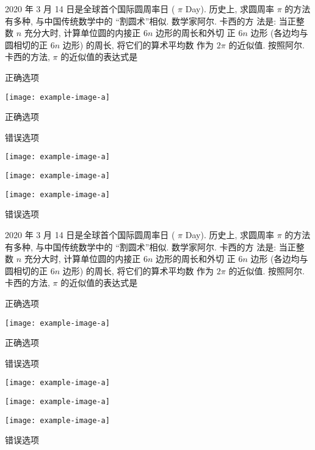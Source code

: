 \documentclass{ctexart}
\begin{document}
    2020 年 3 月 14 日是全球首个国际圆周率日 ( $\pi$ Day). 历史上, 求圆周率 $\pi$ 的方法有多种, 与中国传统数学中的 “割圆术”相似. 数学家阿尔. 卡西的方 法是: 当正整数 $n$ 充分大时, 计算单位圆的内接正 $6 n$ 边形的周长和外切 正 $6 n$ 边形 (各边均与圆相切的正 $6 n$ 边形) 的周长, 将它们的算术平均数 作为 $2 \pi$ 的近似值. 按照阿尔. 卡西的方法, $\pi$ 的近似值的表达式是 \paren

    \begin{xchoices}[mode = figure, items = 4]
      \item* 正确选项
      \item  \texttt{[image: example-image-a]}
      \item* 正确选项
      \item  错误选项
      \item  \texttt{[image: example-image-a]}
      \item  \texttt{[image: example-image-a]}
      \item  \texttt{[image: example-image-a]}
      \item  错误选项
    \end{xchoices}

    2020 年 3 月 14 日是全球首个国际圆周率日 ( $\pi$ Day). 历史上, 求圆周率 $\pi$ 的方法有多种, 与中国传统数学中的 “割圆术”相似. 数学家阿尔. 卡西的方 法是: 当正整数 $n$ 充分大时, 计算单位圆的内接正 $6 n$ 边形的周长和外切 正 $6 n$ 边形 (各边均与圆相切的正 $6 n$ 边形) 的周长, 将它们的算术平均数 作为 $2 \pi$ 的近似值. 按照阿尔. 卡西的方法, $\pi$ 的近似值的表达式是 \paren

    \begin{xchoices}[mode = figure, items = 5]
      \item* 正确选项
      \item  \texttt{[image: example-image-a]}
      \item* 正确选项
      \item  错误选项
      \item  \texttt{[image: example-image-a]}
      \item  \texttt{[image: example-image-a]}
      \item  \texttt{[image: example-image-a]}
      \item  错误选项
    \end{xchoices}
\end{document}
